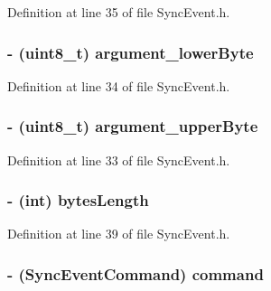 Definition at line 35 of file SyncEvent.h.

\hypertarget{interface_sync_event_a4300b74bd54ca339d5fdbf0187a32d50}{
\subsubsection[{argument\_\-lowerByte}]{\setlength{\rightskip}{0pt plus 5cm}-\/ (uint8\_\-t) argument\_\-lowerByte}}
\label{interface_sync_event_a4300b74bd54ca339d5fdbf0187a32d50}


Definition at line 34 of file SyncEvent.h.

\hypertarget{interface_sync_event_aabc9ba86996bb61d9eb530b84f5a16f9}{
\subsubsection[{argument\_\-upperByte}]{\setlength{\rightskip}{0pt plus 5cm}-\/ (uint8\_\-t) argument\_\-upperByte}}
\label{interface_sync_event_aabc9ba86996bb61d9eb530b84f5a16f9}


Definition at line 33 of file SyncEvent.h.

\hypertarget{interface_sync_event_a539fd2db1da9757b1e4cb56c56313b91}{
\subsubsection[{bytesLength}]{\setlength{\rightskip}{0pt plus 5cm}-\/ (int) bytesLength}}
\label{interface_sync_event_a539fd2db1da9757b1e4cb56c56313b91}


Definition at line 39 of file SyncEvent.h.

\hypertarget{interface_sync_event_aa6a5afb0f81c492c56b326c711e72aff}{
\subsubsection[{command}]{\setlength{\rightskip}{0pt plus 5cm}-\/ ({\bf SyncEventCommand}) command}}
\label{interface_sync_event_aa6a5afb0f81c492c56b326c711e72aff}


